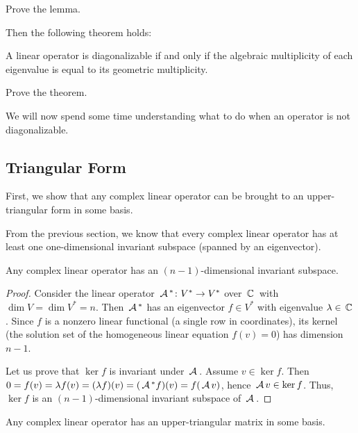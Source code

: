 \begin{exercise}
Prove the lemma.
\end{exercise}

Then the following theorem holds:

\begin{theorem}
A linear operator is diagonalizable if and only if the algebraic multiplicity of each eigenvalue is equal to its geometric multiplicity.
\end{theorem}

\begin{exercise}
Prove the theorem.
\end{exercise}

We will now spend some time understanding what to do when an operator is not diagonalizable.

\subsection{Triangular Form}

First, we show that any complex linear operator can be brought to an upper-triangular form in some basis.

From the previous section, we know that every complex linear operator has at least one one-dimensional invariant subspace (spanned by an eigenvector).

\begin{lemma}
Any complex linear operator has an $(n-1)$-dimensional invariant subspace.
\end{lemma}

\begin{proof}
Consider the linear operator $\,\mathcal{A}\,^{*}\colon V^{*} \to V^{*}$ over $\,\mathbb{C}\,$ with $\dim V = \dim V^{*} = n$. Then $\,\mathcal{A}\,^{*}$ has an eigenvector $f \in V^{*}$ with eigenvalue $\lambda \in \,\mathbb{C}\,$. Since $f$ is a nonzero linear functional (a single row in coordinates), its kernel (the solution set of the homogeneous linear equation $f(v) = 0$) has dimension $n-1$.

Let us prove that $\ker f$ is invariant under $\,\mathcal{A}\,$. Assume $v \in \ker f$. Then $0 = f(v) = \lambda f(v) = (\lambda f)(v) = (\,\mathcal{A}\,^{*}f)(v) = f(\,\mathcal{A}\, v)$, hence $\,\mathcal{A}\, v \in \ker f$. Thus, $\ker f$ is an $(n-1)$-dimensional invariant subspace of $\,\mathcal{A}\,$.
\end{proof}

\begin{corollary}\label{triangular_form}
Any complex linear operator has an upper-triangular matrix in some basis.
\end{corollary}

